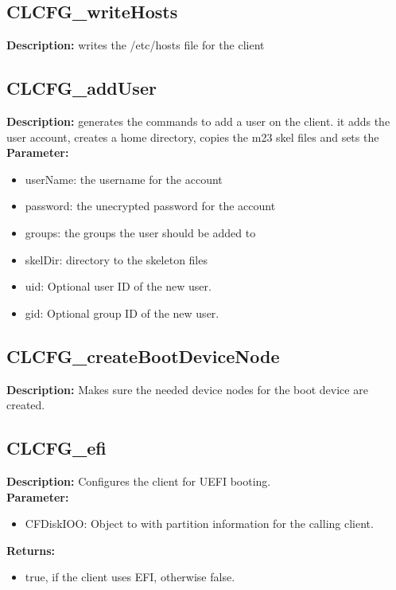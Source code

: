 \subsection{CLCFG\_writeHosts}
\textbf{Description:} writes the /etc/hosts file for the client\\

\subsection{CLCFG\_addUser}
\textbf{Description:} generates the commands to add a user on the client. it adds the user account, creates a home directory, copies the m23 skel files and sets the\\
\textbf{Parameter:}
\begin{itemize}
\item userName: the username for the account
\item password: the unecrypted password for the account
\item groups: the groups the user should be added to
\item skelDir: directory to the skeleton files
\item uid: Optional user ID of the new user.
\item gid: Optional group ID of the new user.
\end{itemize}

\subsection{CLCFG\_createBootDeviceNode}
\textbf{Description:} Makes sure the needed device nodes for the boot device are created.\\

\subsection{CLCFG\_efi}
\textbf{Description:} Configures the client for UEFI booting.\\
\textbf{Parameter:}
\begin{itemize}
\item CFDiskIOO: Object to with partition information for the calling client.
\end{itemize}
\textbf{Returns:}
\begin{itemize}
\item true, if the client uses EFI, otherwise false.
\end{itemize}

